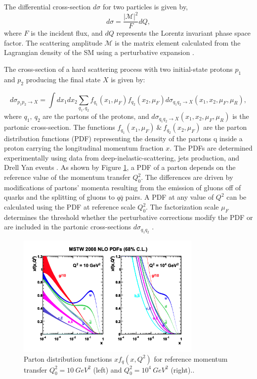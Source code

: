 The differential cross-section $d\sigma$ for two particles is given by, 
\begin{equation}
d\sigma  = \frac{{|\mathcal{M}|}^2}{F} dQ,
\label{eqn:DiffxS}
\end{equation}
where $F$ is the incident flux, and $dQ$ represents the Lorentz invariant phase space factor. The scattering amplitude $\mathcal{M}$ is the matrix element calculated from the Lagrangian density of the SM using a perturbative expansion \cite{QCDForCollider}.

The cross-section of a hard scattering process with two initial-state protons $p_{1}$ and $p_{2}$ producing the final state $X$ is given by:

\begin{equation}
d\sigma_{p_{1}p_{2} \rightarrow X } = \int dx_{1} dx_{2} \sum_{q_{1},q_{2}} f_{q_{1}}(x_{1},\mu_{F})f_{q_{2}}(x_{2},\mu_{F}) d\sigma_{q_{1}q_{2}\rightarrow X } (x_{1},x_{2},\mu_{F},\mu_{R}),
\label{eqn:DifferentialPartonicXS}
\end{equation}
where $q_{1},~ q_{2}$ are the partons of the protons, and $d\sigma_{q_{1}q_{2}\rightarrow X } (x_{1},x_{2},\mu_{F},\mu_{R})$ is the partonic cross-section. The functions $f_{q_{1}}(x_{1},\mu_{F}) ~\&~ f_{q_{2}}(x_{2},\mu_{F})$ are the parton distribution functions (PDF) representing the density of the partons q inside a proton carrying the longitudinal momentum fraction $x$. The PDFs are determined experimentally using data from deep-inelastic-scattering, jets production, and Drell Yan events \cite{FixedTargetDrellYan} \cite{PDF4LHC}. As shown by Figure \ref{fig:PDFFig}, a PDF of a parton depends on the reference value of the momentum transfer $Q_{0}^2$. The differences are driven by modifications of partons' momenta resulting from the emission of gluons off of quarks and the splitting of gluons to $q\bar{q}$ pairs. A PDF at any value of $Q^2$ can be calculated using the PDF at reference scale $Q_{0}^2$. The factorization scale $\mu_{F}$ determines the threshold whether the perturbative corrections modify the PDF or are included in the partonic cross-sections $d\sigma_{q_{1}q_{2}}$ \cite{QCDForCollider}.

\begin{figure}[!htb]
\centering
    \includegraphics[width=0.8\textwidth] {figures/Theory/PDF.pdf}\hspace{1cm}
    \caption{ Parton distribution functions $xf_{q}(x,Q^2)$ for reference momentum transfer $Q^2_{0} = 10 ~ GeV^2$ (left) and $Q^2_{0} = 10^4~ GeV^{2}$ (right).\cite{PDFCalLHC}.}
\label{fig:PDFFig}
\end{figure}

